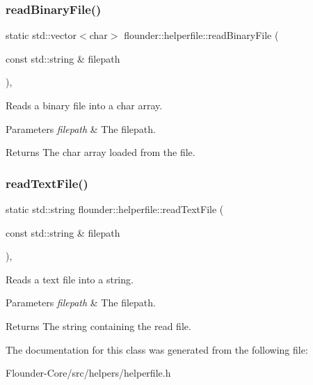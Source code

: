 \subsubsection{\texorpdfstring{read\+Binary\+File()}{readBinaryFile()}}
{\footnotesize\ttfamily static std\+::vector$<$char$>$ flounder\+::helperfile\+::read\+Binary\+File (\begin{DoxyParamCaption}\item[{const std\+::string \&}]{filepath }\end{DoxyParamCaption})\hspace{0.3cm}{\ttfamily [inline]}, {\ttfamily [static]}}



Reads a binary file into a char array. 


\begin{DoxyParams}{Parameters}
{\em filepath} & The filepath. \\
\hline
\end{DoxyParams}
\begin{DoxyReturn}{Returns}
The char array loaded from the file. 
\end{DoxyReturn}
\mbox{\label{classflounder_1_1helperfile_a4f9da9404d2e3e7b7f1453ede0c5ab24}} 
\subsubsection{\texorpdfstring{read\+Text\+File()}{readTextFile()}}
{\footnotesize\ttfamily static std\+::string flounder\+::helperfile\+::read\+Text\+File (\begin{DoxyParamCaption}\item[{const std\+::string \&}]{filepath }\end{DoxyParamCaption})\hspace{0.3cm}{\ttfamily [inline]}, {\ttfamily [static]}}



Reads a text file into a string. 


\begin{DoxyParams}{Parameters}
{\em filepath} & The filepath. \\
\hline
\end{DoxyParams}
\begin{DoxyReturn}{Returns}
The string containing the read file. 
\end{DoxyReturn}


The documentation for this class was generated from the following file\+:\begin{DoxyCompactItemize}
\item 
Flounder-\/\+Core/src/helpers/helperfile.\+h\end{DoxyCompactItemize}
